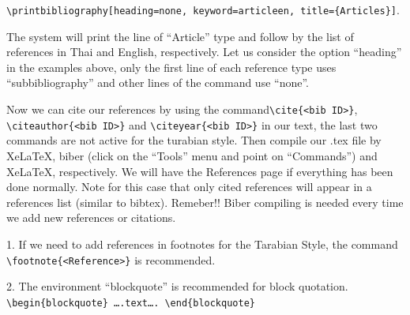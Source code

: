 \hspace*{-3cm}\verb|\printbibliography[heading=none, keyword=articleen, title={Articles}]|.\vskip2mm 

\subsubsectionindent The system will print the line of “Article” type and follow by the list of references in Thai and English, respectively. Let us consider the option “heading” in the examples above, only the first line of each reference type uses “subbibliography” and other lines of the command use “none”.

\subsubsectionindent Now we can cite our references by using the command\linebreak \verb|\cite{<bib ID>}|, \verb|\citeauthor{<bib ID>}| and \verb|\citeyear{<bib ID>}| in our text, the last two commands are not active for the turabian style. Then compile our .tex file by XeLaTeX, biber (click on the “Tools” menu and point on “Commands”) and XeLaTeX, respectively. We will have the References page if everything has been done normally. Note for this case that only cited references will appear in a references list (similar to bibtex). Remeber!! Biber compiling is needed every time we add new references or citations.



%
%
%
%
%


\bigskip
{} 1. If we need to add references in footnotes for the Tarabian Style, the command \verb|\footnote{<Reference>}| is recommended.

\hspace{-2.5mm}2. The environment “blockquote” is recommended for block quotation.\\
\verb|\begin{blockquote} ….text…. \end{blockquote}|



%	





